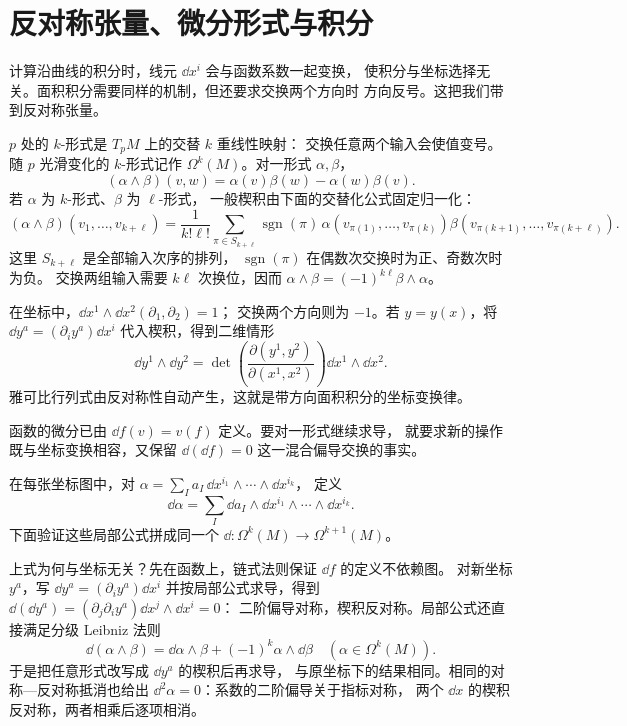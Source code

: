 \section{反对称张量、微分形式与积分}
\label{sec:math-forms-from-tensors}

计算沿曲线的积分时，线元 \(\dd x^i\) 会与函数系数一起变换，
使积分与坐标选择无关。面积积分需要同样的机制，但还要求交换两个方向时
方向反号。这把我们带到反对称张量。

\begin{definition}[微分形式与楔积]
\(p\) 处的 \(k\)-形式是 \(T_pM\) 上的交替 \(k\) 重线性映射：
交换任意两个输入会使值变号。随 \(p\) 光滑变化的 \(k\)-形式记作
\(\Omega^k(M)\)。对一形式 \(\alpha,\beta\)，
\[
(\alpha\wedge\beta)(v,w)
=\alpha(v)\beta(w)-\alpha(w)\beta(v).
\]
若 \(\alpha\) 为 \(k\)-形式、\(\beta\) 为 \(\ell\)-形式，
一般楔积由下面的交替化公式固定归一化：
\[
(\alpha\wedge\beta)(v_1,\ldots,v_{k+\ell})
=\frac1{k!\ell!}\sum_{\pi\in S_{k+\ell}}
\operatorname{sgn}(\pi)\,
\alpha(v_{\pi(1)},\ldots,v_{\pi(k)})
\beta(v_{\pi(k+1)},\ldots,v_{\pi(k+\ell)}).
\]
这里 \(S_{k+\ell}\) 是全部输入次序的排列，
\(\operatorname{sgn}(\pi)\) 在偶数次交换时为正、奇数次时为负。
交换两组输入需要 \(k\ell\) 次换位，因而
\(\alpha\wedge\beta=(-1)^{k\ell}\beta\wedge\alpha\)。
\end{definition}

在坐标中，\(\dd x^1\wedge \dd x^2(\partial_1,\partial_2)=1\)；
交换两个方向则为 \(-1\)。若 \(y=y(x)\)，将
\(\dd y^a=(\partial_i y^a)\dd x^i\) 代入楔积，得到二维情形
\[
\dd y^1\wedge \dd y^2
=\det\!\left(\frac{\partial(y^1,y^2)}
{\partial(x^1,x^2)}\right)\dd x^1\wedge \dd x^2.
\]
雅可比行列式由反对称性自动产生，这就是带方向面积积分的坐标变换律。

函数的微分已由 \(\dd f(v)=v(f)\) 定义。要对一形式继续求导，
就要求新的操作既与坐标变换相容，又保留
\(\dd(\dd f)=0\) 这一混合偏导交换的事实。

\begin{definition}[外微分]
在每张坐标图中，对
\(\alpha=\sum_I a_I\,\dd x^{i_1}\wedge\cdots\wedge \dd x^{i_k}\)，
定义
\[
\dd\alpha=\sum_I \dd a_I\wedge \dd x^{i_1}\wedge\cdots\wedge \dd x^{i_k}.
\]
下面验证这些局部公式拼成同一个
\(\dd:\Omega^k(M)\to\Omega^{k+1}(M)\)。
\end{definition}

上式为何与坐标无关？先在函数上，链式法则保证 \(\dd f\) 的定义不依赖图。
对新坐标 \(y^a\)，写
\(\dd y^a=(\partial_i y^a)\dd x^i\) 并按局部公式求导，得到
\(\dd(\dd y^a)=(\partial_j\partial_i y^a)\dd x^j\wedge \dd x^i=0\)：
二阶偏导对称，楔积反对称。局部公式还直接满足分级 Leibniz 法则
\[
\dd(\alpha\wedge\beta)
=\dd\alpha\wedge\beta+(-1)^k\alpha\wedge \dd\beta
\quad(\alpha\in\Omega^k(M)).
\]
于是把任意形式改写成 \(\dd y^a\) 的楔积后再求导，
与原坐标下的结果相同。相同的对称—反对称抵消也给出
\(\dd^2\alpha=0\)：系数的二阶偏导关于指标对称，
两个 \(\dd x\) 的楔积反对称，两者相乘后逐项相消。

